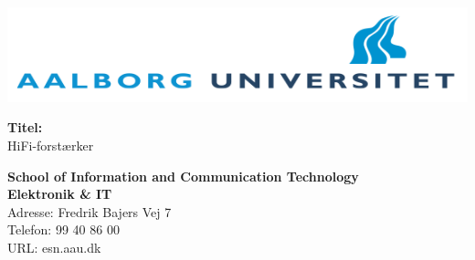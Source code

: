 \begin{multicols}{2}
\includegraphics[scale=0.35]{forside/aau.png}

\small{\textbf{Titel:\\}
HiFi-forstærker}

\scriptsize{\textbf{School of Information and Communication Technology\\ Elektronik \& IT\\}
Adresse: Fredrik Bajers Vej 7\\
Telefon: 99 40 86 00\\
URL: esn.aau.dk \\}
\end{multicols}
